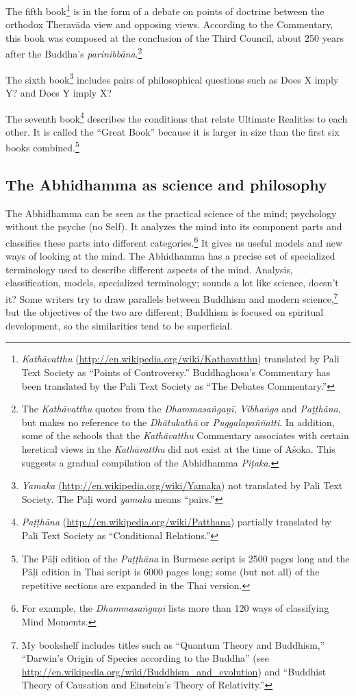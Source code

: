 The fifth book\footnote{\textit{Kathāvatthu} (\url{http://en.wikipedia.org/wiki/Kathavatthu}) translated by Pali Text Society as “Points of Controversy.” Buddhaghosa’s Commentary has been translated by the Pali Text Society as “The Debates Commentary.”} is in the form of a debate on points of doctrine between the orthodox Theravāda view and opposing views. According to the Commentary, this book was composed at the conclusion of the Third Council, about 250 years after the Buddha’s \textit{parinibbāna}.\footnote{The \textit{Kathāvatthu} quotes from the \textit{Dhammasaṅgaṇī}, \textit{Vibhaṅga} and \textit{Paṭṭhāna}, but makes no reference to the \textit{Dhātukathā} or \textit{Puggalapaññatti}. In addition, some of the schools that the \textit{Kathāvatthu} Commentary associates with certain heretical views in the \textit{Kathāvatthu} did not exist at the time of Aśoka. This suggests a gradual compilation of the Abhidhamma \textit{Piṭaka}.}

The sixth book\footnote{\textit{Yamaka} (\url{http://en.wikipedia.org/wiki/Yamaka}) not translated by Pali Text Society. The Pāḷi word \textit{yamaka} means “pairs.”} includes pairs of philosophical questions such as Does X imply Y? and Does Y imply X?

The seventh book\footnote{\textit{Paṭṭhāna} (\url{http://en.wikipedia.org/wiki/Patthana}) partially translated by Pali Text Society as “Conditional Relations.”} describes the conditions that relate Ultimate Realities to each other. It is called the “Great Book” because it is larger in size than the first six books combined.\footnote{The Pāḷi edition of the \textit{Paṭṭhāna} in Burmese script is 2500 pages long and the Pāḷi edition in Thai script is 6000 pages long; some (but not all) of the repetitive sections are expanded in the Thai version.}

\subsection*{The Abhidhamma as science and philosophy}

The Abhidhamma can be seen as the practical science of the mind; psychology without the psyche (no Self). It analyzes the mind into its component parts and classifies these parts into different categories.\footnote{For example, the \textit{Dhammasaṅgaṇī} lists more than 120 ways of classifying Mind Moments.} It gives us useful models and new ways of looking at the mind. The Abhidhamma has a precise set of specialized terminology used to describe different aspects of the mind. Analysis, classification, models, specialized terminology; sounds a lot like science, doesn’t it? Some writers try to draw parallels between Buddhism and modern science,\footnote{My bookshelf includes titles such as “Quantum Theory and Buddhism,” “Darwin’s Origin of Species according to the Buddha” (see \url{http://en.wikipedia.org/wiki/Buddhism_and_evolution}) and “Buddhist Theory of Causation and Einstein’s Theory of Relativity.”} but the objectives of the two are different; Buddhism is focused on spiritual development, so the similarities tend to be superficial.


